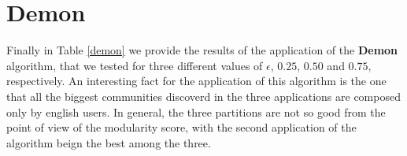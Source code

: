 
\section{Demon} %
\label{sec:demon}
    Finally in Table \ref{demon} we provide the results of the application of the \textbf{Demon} algorithm, that
    we tested for three different values of $\epsilon$, $0.25$, $0.50$ and $0.75$, respectively. An interesting
    fact for the application of this algorithm is the one that all the biggest communities discoverd in the three
    applications are composed only by english users. In general, the three partitions are not so good from the
    point of view of the modularity score, with the second application of the algorithm beign the best among the
    three.

    \begin{table}[H]
        \centering
        \begin{subtable}{\textwidth}
        \end{subtable}
        \caption{Evaluation of the partition obtained by the application of the Demon algorithm.}
        \label{demon}
    \end{table}

